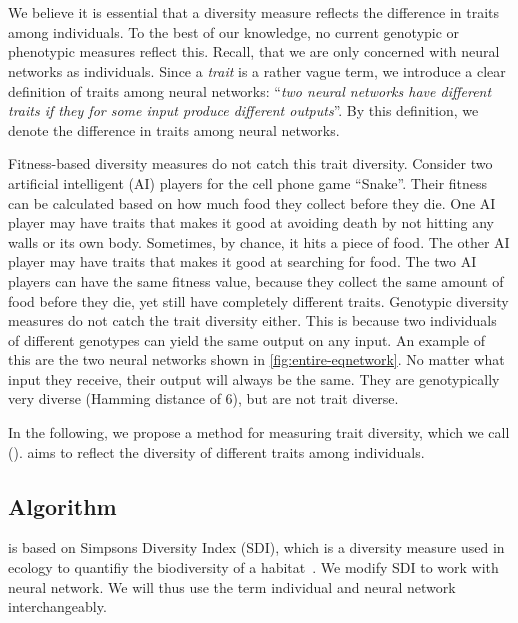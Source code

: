 \section{\di{}}
We believe it is essential that a diversity measure reflects the difference in traits among individuals. To the best of our knowledge, no current genotypic or phenotypic measures reflect this. Recall, that we are only concerned with neural networks as individuals. Since a \emph{trait} is a rather vague term, we introduce a clear definition of traits among neural networks: ``\emph{two neural networks have different traits if they for some input produce different outputs}''. By this definition, we denote the difference in traits among neural networks.

Fitness-based diversity measures do not catch this trait diversity. Consider two artificial intelligent (AI) players for the cell phone game ``Snake''. Their fitness can be calculated based on how much food they collect before they die. One AI player may have traits that makes it good at avoiding death by not hitting any walls or its own body. Sometimes, by chance, it hits a piece of food. The other AI player may have traits that makes it good at searching for food. The two AI players can have the same fitness value, because they collect the same amount of food before they die, yet still have completely different traits. Genotypic diversity measures do not catch the trait diversity either. This is because two individuals of different genotypes can yield the same output on any input. An example of this are the two neural networks shown in \cref{fig:entire-eqnetwork}. No matter what input they receive, their output will always be the same. They are genotypically very diverse (Hamming distance of 6), but are not trait diverse.
%

%

In the following, we propose a method for measuring trait diversity, which we call \emph{\di{}} (\dia). \dia{} aims to reflect the diversity of different traits among individuals. 

\subsection{Algorithm}
\dia{} is based on Simpsons Diversity Index (SDI), which is a diversity measure used in ecology to quantifiy the biodiversity of a habitat~\cite{simpson1949measurement}. We modify SDI to work with neural network. We will thus use the term individual and neural network interchangeably.

